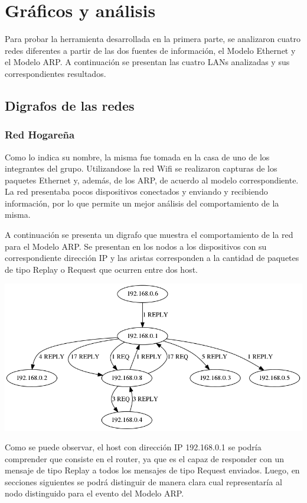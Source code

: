 \section{Gráficos y análisis}
Para probar la herramienta desarrollada en la primera parte, se analizaron cuatro redes diferentes a partir de las dos fuentes de información, el Modelo Ethernet y el Modelo ARP. 
A continuación se presentan las cuatro LANs analizadas y sus correspondientes resultados. 

\subsection{Digrafos de las redes}\label{"Grafos"}

\subsubsection{Red Hogareña}
Como lo indica su nombre, la misma fue tomada en la casa de uno de los integrantes del grupo. Utilizandose la red Wifi se realizaron capturas de los paquetes Ethernet y, además, de los ARP, de acuerdo al modelo correspondiente. La red presentaba pocos dispositivos conectados y enviando y recibiendo información, por lo que permite un mejor análisis del comportamiento de la misma. 

A continuación se presenta un digrafo que muestra el comportamiento de la red para el Modelo ARP. Se presentan en los nodos a los dispositivos con su correspondiente dirección IP y las aristas corresponden a la cantidad de paquetes de tipo Replay o Request que ocurren entre dos host. 


\centerline{\includegraphics[width=1\textwidth]{./graficos/grafos-arp/grafo_casa_mari.png}}


Como se puede observar, el host con dirección IP 192.168.0.1 se podría comprender que consiste en el router, ya que es el capaz de responder con un mensaje de tipo Replay a todos los mensajes de tipo Request enviados. Luego, en secciones siguientes se podrá distinguir de manera clara cual representaría al nodo distinguido para el evento del Modelo ARP. 

